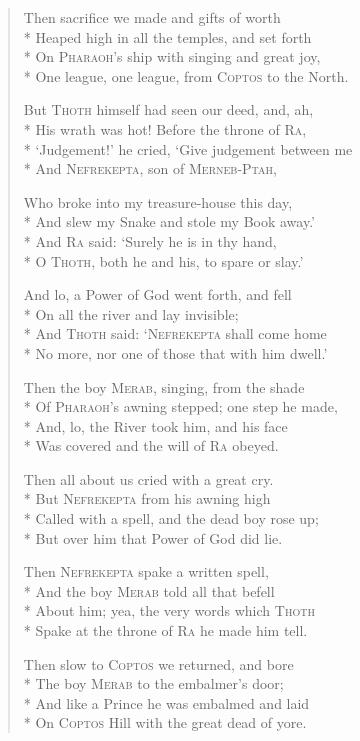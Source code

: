 \documentclass[12pt]{article}
\newcommand{\vin}{\hspace{1em}}
\begin{document}
\begin{verse}
Then sacrifice we made and gifts of worth\\*
Heaped high in all the temples, and set forth\\*
\vin On \textsc{Pharaoh}'s ship with singing and great joy,\\*
One league, one league, from \textsc{Coptos} to the North.

But \textsc{Thoth} himself had seen our deed, and, ah,\\*
His wrath was hot! Before the throne of \textsc{Ra},\\*
\vin `Judgement!' he cried, `Give judgement between me\\*
And \textsc{Nefrekepta}, son of \textsc{Merneb-Ptah},

Who broke into my treasure-house this day,\\*
And slew my Snake and stole my Book away.'\\*
\vin And \textsc{Ra} said: `Surely he is in thy hand,\\*
O \textsc{Thoth}, both he and his, to spare or slay.'

And lo, a Power of God went forth, and fell\\*
On all the river and lay invisible;\\*
\vin And \textsc{Thoth} said: `\textsc{Nefrekepta} shall come home\\*
No more, nor one of those that with him dwell.'

Then the boy \textsc{Merab}, singing, from the shade\\*
Of \textsc{Pharaoh}'s awning stepped; one step he made,\\*
\vin And, lo, the River took him, and his face\\*
Was covered and the will of \textsc{Ra} obeyed.

Then all about us cried with a great cry.\\*
But \textsc{Nefrekepta} from his awning high\\*
\vin Called with a spell, and the dead boy rose up;\\*
But over him that Power of God did lie.

Then \textsc{Nefrekepta} spake a written spell,\\*
And the boy \textsc{Merab} told all that befell\\*
\vin About him; yea, the very words which \textsc{Thoth}\\*
Spake at the throne of \textsc{Ra} he made him tell.

Then slow to \textsc{Coptos} we returned, and bore\\*
The boy \textsc{Merab} to the embalmer's door;\\*
\vin And like a Prince he was embalmed and laid\\*
On \textsc{Coptos} Hill with the great dead of yore.


\end{verse}
\end{document}

